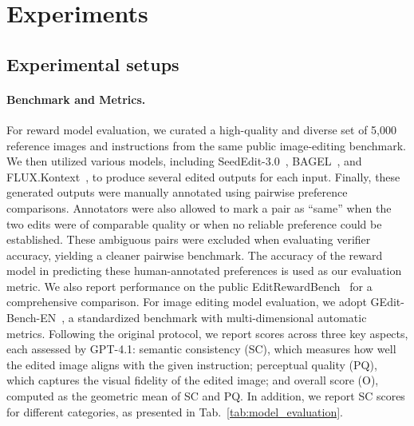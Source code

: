\section{Experiments}
\subsection{Experimental setups}



\paragraph{Benchmark and Metrics.}
For reward model evaluation, we curated a high-quality and diverse set of 5,000 reference images and instructions from the same public image-editing benchmark. 
We then utilized various models, including SeedEdit-3.0~\citep{wang2025seededit}, BAGEL~\citep{deng2025emerging}, and FLUX.Kontext~\citep{batifol2025flux}, to produce several edited outputs for each input. Finally, these generated outputs were manually annotated using pairwise preference comparisons. 
Annotators were also allowed to mark a pair as ``same'' when the two edits were of comparable quality or when no reliable preference could be established. These ambiguous pairs were excluded when evaluating verifier accuracy, yielding a cleaner pairwise benchmark.
The accuracy of the reward model in predicting these human-annotated preferences is used as our evaluation metric. We also report performance on the public EditRewardBench~\citep{luo2025editscore} for a comprehensive comparison.
For image editing model evaluation, we adopt GEdit-Bench-EN~\citep{liu2025step1x}, a standardized benchmark with multi-dimensional automatic metrics. Following the original protocol, we report scores across three key aspects, each assessed by GPT-4.1: semantic consistency (SC), which measures how well the edited image aligns with the given instruction; perceptual quality (PQ), which captures the visual fidelity of the edited image; and overall score (O), computed as the geometric mean of SC and PQ. In addition, we report SC scores for different categories, as presented in Tab.~\ref{tab:model_evaluation}.

